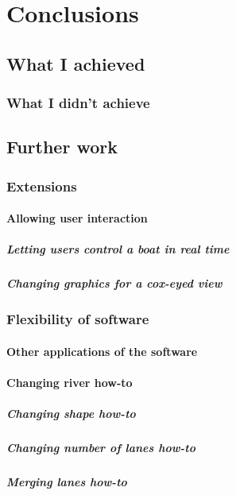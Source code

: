 \chapter{Conclusions}\label{chapter:conclusions}
  \section{What I achieved}
    \subsection{What I didn't achieve}
    
  \section{Further work}
    \subsection{Extensions}
      \subsubsection{Allowing user interaction}
        \paragraph{Letting users control a boat in real time}
        \paragraph{Changing graphics for a cox-eyed view}
    \subsection{Flexibility of software}
      \subsubsection{Other applications of the software}
      \subsubsection{Changing river how-to}
        \paragraph{Changing shape how-to}
        \paragraph{Changing number of lanes how-to}
        \paragraph{Merging lanes how-to}
